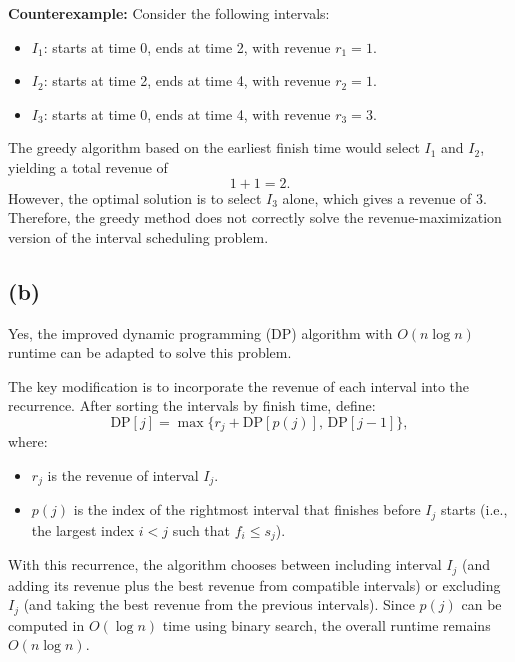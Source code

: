 \documentclass[11pt]{article}
\begin{document}
    \medskip
    \noindent\textbf{Counterexample:} Consider the following intervals:
    \begin{itemize}
        \item \( I_1 \): starts at time 0, ends at time 2, with revenue \( r_1 = 1 \).
        \item \( I_2 \): starts at time 2, ends at time 4, with revenue \( r_2 = 1 \).
        \item \( I_3 \): starts at time 0, ends at time 4, with revenue \( r_3 = 3 \).
    \end{itemize}
    The greedy algorithm based on the earliest finish time would select \( I_1 \) and \( I_2 \), yielding a total revenue of 
    \[
    1 + 1 = 2.
    \]
    However, the optimal solution is to select \( I_3 \) alone, which gives a revenue of 3. Therefore, the greedy method does not correctly solve the revenue-maximization version of the interval scheduling problem.
    
    \subsection*{(b)}
    Yes, the improved dynamic programming (DP) algorithm with \( O(n \log n) \) runtime can be adapted to solve this problem.
    
    \medskip
    \noindent The key modification is to incorporate the revenue of each interval into the recurrence. After sorting the intervals by finish time, define:
    \[
    \text{DP}[j] = \max\{r_j + \text{DP}[p(j)],\, \text{DP}[j-1]\},
    \]
    where:
    \begin{itemize}
        \item \( r_j \) is the revenue of interval \( I_j \).
        \item \( p(j) \) is the index of the rightmost interval that finishes before \( I_j \) starts (i.e., the largest index \( i < j \) such that \( f_i \le s_j \)).
    \end{itemize}
    
    \medskip
    \noindent With this recurrence, the algorithm chooses between including interval \( I_j \) (and adding its revenue plus the best revenue from compatible intervals) or excluding \( I_j \) (and taking the best revenue from the previous intervals). Since \( p(j) \) can be computed in \( O(\log n) \) time using binary search, the overall runtime remains \( O(n \log n) \).
    


    \newpage
\end{document}
